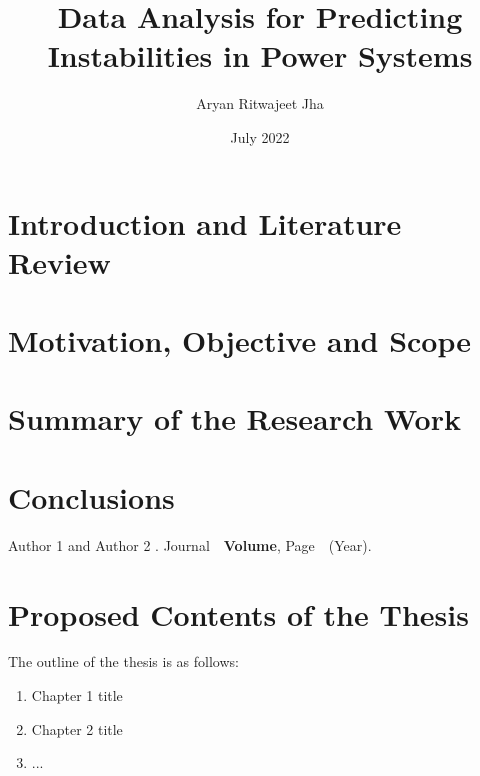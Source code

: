 \documentclass[MS,synopsis]{iitddiss}
\title{Data Analysis for Predicting Instabilities in Power Systems}
\author{Aryan Ritwajeet Jha}
\date{July 2022}
\begin{document}
\maketitle



\setcounter{page}{0}
\section{Introduction and Literature Review}

\section{Motivation, Objective and Scope}

\section{Summary of the Research Work}

\section{Conclusions}



\begin{singlespace}
\begin{thebibliography}{10}

Author 1 and Author 2
.
\newblock Journal\ \ {\bf Volume}, Page\ \ (Year).
\end{thebibliography}

\end{singlespace}




\section{Proposed Contents of the Thesis}
The outline of the thesis is as follows:
\begin{enumerate}
\item Chapter 1 title
\item Chapter 2 title
\item ...
\end{enumerate}
\end{document}
